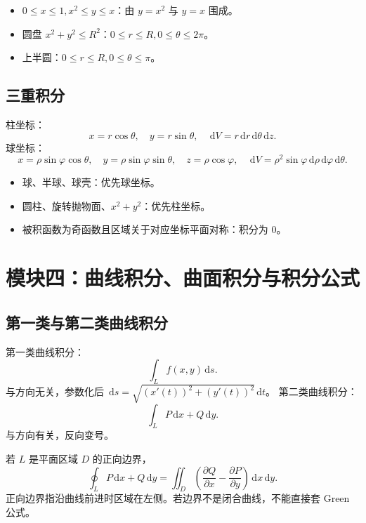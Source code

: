 \documentclass[UTF8,zihao=-4]{ctexart}
\newcommand{\dd}{\,\mathrm d}
\begin{document}
\begin{keybox}[常见区域]
\begin{itemize}
  \item $0\le x\le 1, x^2\le y\le x$：由 $y=x^2$ 与 $y=x$ 围成。
  \item 圆盘 $x^2+y^2\le R^2$：$0\le r\le R,0\le\theta\le2\pi$。
  \item 上半圆：$0\le r\le R,0\le\theta\le\pi$。
\end{itemize}
\end{keybox}

\subsection{三重积分}
\begin{keybox}[坐标变换]
柱坐标：
\[
x=r\cos\theta,\quad y=r\sin\theta,
\quad \dd V=r\dd r\dd\theta\dd z.
\]
球坐标：
\[
x=\rho\sin\varphi\cos\theta,
\quad y=\rho\sin\varphi\sin\theta,
\quad z=\rho\cos\varphi,
\quad \dd V=\rho^2\sin\varphi\dd\rho\dd\varphi\dd\theta.
\]
\end{keybox}

\begin{methodbox}[三重积分选坐标]
\begin{itemize}
  \item 球、半球、球壳：优先球坐标。
  \item 圆柱、旋转抛物面、$x^2+y^2$：优先柱坐标。
  \item 被积函数为奇函数且区域关于对应坐标平面对称：积分为 0。
\end{itemize}
\end{methodbox}

\section{模块四：曲线积分、曲面积分与积分公式}

\subsection{第一类与第二类曲线积分}
\begin{keybox}[曲线积分]
第一类曲线积分：
\[
\int_L f(x,y)\dd s.
\]
与方向无关，参数化后 $\dd s=\sqrt{(x'(t))^2+(y'(t))^2}\dd t$。
第二类曲线积分：
\[
\int_L P\dd x+Q\dd y.
\]
与方向有关，反向变号。
\end{keybox}

\begin{methodbox}[Green 公式]
若 $L$ 是平面区域 $D$ 的正向边界，
\[
\oint_L P\dd x+Q\dd y=\iint_D\left(\frac{\partial Q}{\partial x}-\frac{\partial P}{\partial y}\right)\dd x\dd y.
\]
正向边界指沿曲线前进时区域在左侧。若边界不是闭合曲线，不能直接套 Green 公式。
\end{methodbox}
\end{document}
